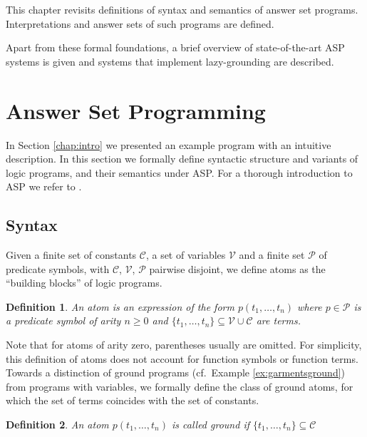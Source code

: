 \documentclass{vutinfth} %
\newtheorem{definition}{Definition}[chapter]
\begin{document}
This chapter revisits definitions of syntax and semantics of answer set programs. Interpretations and answer sets of such programs are defined.

Apart from these formal foundations, a brief overview of state-of-the-art ASP systems is given and systems that implement lazy-grounding are described.

\section{Answer Set Programming}

In Section \ref{chap:intro} we presented an example program with an intuitive description. In this section we formally define syntactic structure and variants of logic programs, and their semantics under ASP. For a thorough introduction to ASP we refer to \cite{DBLP:conf/rweb/EiterIK09}.

\subsection{Syntax}


Given a finite set of constants $\mathcal{C}$, a set of variables $\mathcal{V}$ and a finite set $\mathcal{P}$ of predicate symbols, with $\mathcal{C}$, $\mathcal{V}$, $\mathcal{P}$ pairwise disjoint, we define atoms as the \enquote{building blocks} of logic programs.

\begin{definition}
An \emph{atom} is an expression of the form $p(t_1, \ldots , t_n)$ where $p \in \mathcal{P}$ is a predicate symbol of arity $n \geq 0$ and $\{ t_1, \ldots , t_n \} \subseteq \mathcal{V} \cup \mathcal{C}$ are terms.
\end{definition}

Note that for atoms of arity zero, parentheses usually are omitted. For simplicity, this definition of atoms does not account for function symbols or function terms. Towards a distinction of ground programs (cf.~Example \ref{ex:garmentsground}) from programs with variables, we formally define the class of ground atoms, for which the set of terms coincides with the set of constants.

\begin{definition}
An atom $p(t_1, \ldots , t_n)$ is called \emph{ground} if $\{ t_1, \ldots , t_n \} \subseteq \mathcal{C}$
\end{definition}
\end{document}

